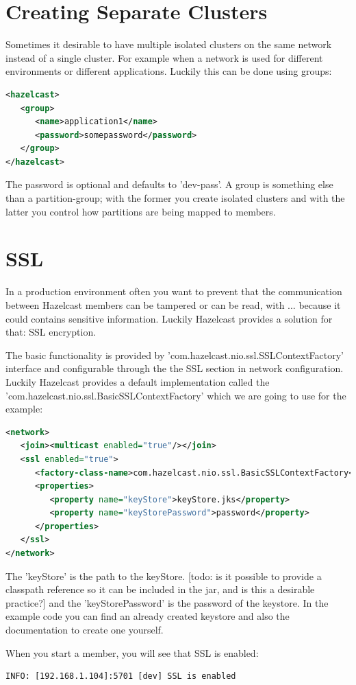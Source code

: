 \section{Creating Separate Clusters}
Sometimes it desirable to have multiple isolated clusters on the same network instead of a single cluster. For example when a network is used for different environments or different applications. Luckily this can be done using groups:
\begin{lstlisting}[language=xml]
<hazelcast>
   <group>
      <name>application1</name>
      <password>somepassword</password>
   </group>
</hazelcast>
\end{lstlisting}
The password is optional and defaults to 'dev-pass'. A group is something else than a partition-group; with the former you create isolated clusters and with the latter you control how partitions are being mapped to members.

\section{SSL}
In a production environment often you want to prevent that the communication between Hazelcast members can be tampered or can be read, with ... because it could contains sensitive information. Luckily Hazelcast provides a solution for that: SSL encryption.

The basic functionality is provided by 'com.hazelcast.nio.ssl.SSLContextFactory' interface and configurable through the the SSL section in network configuration. Luckily Hazelcast provides a default implementation called the 'com.hazelcast.nio.ssl.BasicSSLContextFactory' which we are going to use for the example:
\begin{lstlisting}[language=xml]
<network>
   <join><multicast enabled="true"/></join>
   <ssl enabled="true">
      <factory-class-name>com.hazelcast.nio.ssl.BasicSSLContextFactory</factory-class-name>
      <properties>
         <property name="keyStore">keyStore.jks</property>
         <property name="keyStorePassword">password</property>
      </properties>
   </ssl>
</network>
\end{lstlisting}
The 'keyStore' is the path to the keyStore. [todo: is it possible to provide a classpath reference so it can be included in the jar, and is this a desirable practice?] and the 'keyStorePassword' is the password of the keystore. In the example code you can find an already created keystore and also the documentation to create one yourself.

When you start a member, you will see that SSL is enabled:
\begin{lstlisting}
INFO: [192.168.1.104]:5701 [dev] SSL is enabled
\end{lstlisting}

